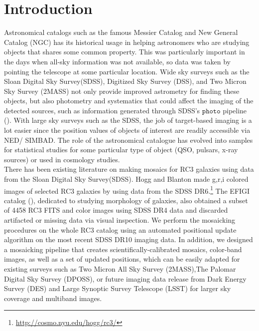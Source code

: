 \documentclass[5p]{elsarticle}
\begin{document}
\section{Introduction}
Astronomical catalogs such as the famous Messier Catalog and New General Catalog (NGC) has its historical usage in helping  astronomers who are studying objects that shares some common property. This was particularly important in the days when all-sky information was not available, so data was taken by pointing the telescope at some particular location.  
Wide sky surveys such as the Sloan Digital Sky Survey(SDSS), Digitized Sky Survey (DSS), and Two Micron Sky Survey (2MASS) not only provide improved astrometry for finding these objects, but also photometry and systematics  that could affect the imaging of the detected sources, such as information generated through SDSS's $\texttt{photo}$ pipeline (\citet{photopaper}).
With large sky surveys such as the SDSS, the job of target-based imaging is a lot easier since the position values of objects of interest are readily accessible via NED/ SIMBAD. The role of the astronomical catalogue has evolved into samples for statistical studies for some particular type of object (QSO, pulsars, x-ray sources) or used in cosmology studies.
\\
\indent
There has been existing literature on making mosaics for RC3 galaxies using data from the Sloan Digital Sky Survey(SDSS). Hogg and Blanton made g,r,i colored images of selected RC3 galaxies by using data from the SDSS DR6.\footnote{\url{http://cosmo.nyu.edu/hogg/rc3/}} The EFIGI catalog (\citet{efigi}), dedicated to studying morphology of galaxies, also  obtained a subset of 4458 RC3 FITS and color images using SDSS DR4 data and discarded artifacted or missing data via visual inspection. We perform the mosaicking procedures on the whole RC3 catalog using an automated positional update algorithm on the most recent SDSS DR10 imaging data. In addition, we designed a mosaicking pipeline that creates scientifically-calibrated mosaics, color-band images, as well as a set of updated positions, which can be easily adapted for existing surveys such as Two Micron All Sky Survey  (2MASS),The Palomar Digital Sky Survey (DPOSS), or future imaging data release from  Dark Energy Survey (DES) and Large Synoptic Survey Telescope (LSST) for larger sky coverage and multiband images.
\end{document}
